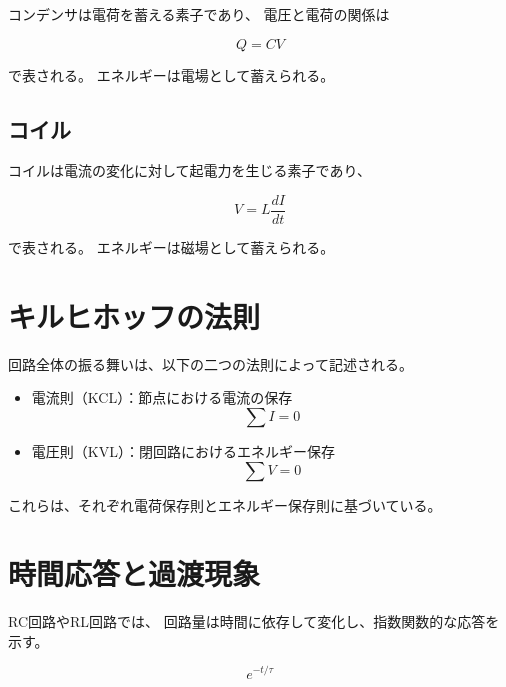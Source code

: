 コンデンサは電荷を蓄える素子であり、
電圧と電荷の関係は

\begin{equation}
Q = CV
\end{equation}

で表される。
エネルギーは電場として蓄えられる。



\subsection{コイル}

コイルは電流の変化に対して起電力を生じる素子であり、

\begin{equation}
V = L\frac{dI}{dt}
\end{equation}

で表される。
エネルギーは磁場として蓄えられる。



\section{キルヒホッフの法則}

回路全体の振る舞いは、以下の二つの法則によって記述される。

\begin{itemize}
\item 電流則（KCL）：節点における電流の保存
\begin{equation}
\sum I = 0
\end{equation}

\item 電圧則（KVL）：閉回路におけるエネルギー保存
\begin{equation}
\sum V = 0
\end{equation}
\end{itemize}

これらは、それぞれ電荷保存則とエネルギー保存則に基づいている。



\section{時間応答と過渡現象}

RC回路やRL回路では、
回路量は時間に依存して変化し、指数関数的な応答を示す。

\begin{equation}
e^{-t/\tau}
\end{equation}

